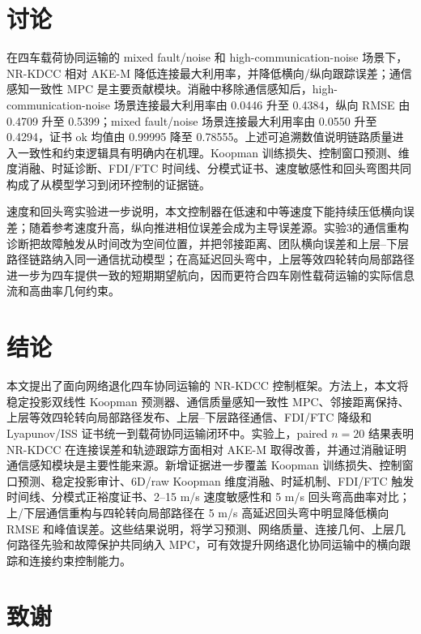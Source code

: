 \documentclass[twocolumn,3p,times,procedia]{elsarticle}
\newcommand{\todozh}[1]{\textcolor{red}{[待补：#1]}}
\newif\ifNRReview
\newcommand{\reviewblock}[1]{\ifNRReview\par\smallskip\noindent\begingroup\setlength{\fboxsep}{4pt}\colorbox{yellow!35}{\parbox{0.96\linewidth}{\footnotesize\textbf{当前不足：} #1}}\endgroup\par\smallskip\fi}
\renewcommand{\todozh}[1]{\ifNRReview\textcolor{red}{[待补：#1]}\fi}
\newcommand{\AKE}{AKE-M}
\newcommand{\Method}{NR-KDCC}
\begin{document}
\FloatBarrier

\section{讨论}

在四车载荷协同运输的 mixed fault/noise 和 high-communication-noise 场景下，\Method{} 相对 \AKE{} 降低连接最大利用率，并降低横向/纵向跟踪误差；通信感知一致性 MPC 是主要贡献模块。消融中移除通信感知后，high-communication-noise 场景连接最大利用率由 0.0446 升至 0.4384，纵向 RMSE 由 0.4709 升至 0.5399；mixed fault/noise 场景连接最大利用率由 0.0550 升至 0.4294，证书 ok 均值由 0.99995 降至 0.78555。上述可追溯数值说明链路质量进入一致性和约束逻辑具有明确内在机理。Koopman 训练损失、控制窗口预测、维度消融、时延诊断、FDI/FTC 时间线、分模式证书、速度敏感性和回头弯图共同构成了从模型学习到闭环控制的证据链。

速度和回头弯实验进一步说明，本文控制器在低速和中等速度下能持续压低横向误差；随着参考速度升高，纵向推进相位误差会成为主导误差源。实验3的通信重构诊断把故障触发从时间改为空间位置，并把邻接距离、团队横向误差和上层--下层路径链路纳入同一通信扰动模型；在高延迟回头弯中，上层等效四轮转向局部路径进一步为四车提供一致的短期期望航向，因而更符合四车刚性载荷运输的实际信息流和高曲率几何约束。

\reviewblock{投稿前主要缺口包括：严格 AKE-A 复现或强物理/DMPC baseline；delay/dropout dose-response 与 topology recovery；FDI/FTC 多 seed 检测延迟、误报率和切换延迟统计；受力 $F_x,F_y,M_z$ 分量和力平滑权重消融；no-offset 面板已形成 RMSE/峰值改善且回头弯团队中心峰值低于 0.2 m，但尚未闭合全过程逐点严格优势。}

\section{结论}

本文提出了面向网络退化四车协同运输的 \Method{} 控制框架。方法上，本文将稳定投影双线性 Koopman 预测器、通信质量感知一致性 MPC、邻接距离保持、上层等效四轮转向局部路径发布、上层--下层路径通信、FDI/FTC 降级和 Lyapunov/ISS 证书统一到载荷协同运输闭环中。实验上，paired $n=20$ 结果表明 \Method{} 在连接误差和轨迹跟踪方面相对 \AKE{} 取得改善，并通过消融证明通信感知模块是主要性能来源。新增证据进一步覆盖 Koopman 训练损失、控制窗口预测、稳定投影审计、6D/raw Koopman 维度消融、时延机制、FDI/FTC 触发时间线、分模式正裕度证书、2--15 m/s 速度敏感性和 5 m/s 回头弯高曲率对比；上/下层通信重构与四轮转向局部路径在 5 m/s 高延迟回头弯中明显降低横向 RMSE 和峰值误差。这些结果说明，将学习预测、网络质量、连接几何、上层几何路径先验和故障保护共同纳入 MPC，可有效提升网络退化协同运输中的横向跟踪和连接约束控制能力。

\section*{致谢}

\todozh{补充基金项目、课题编号和作者贡献声明。}

\FloatBarrier
\balance


\end{document}
